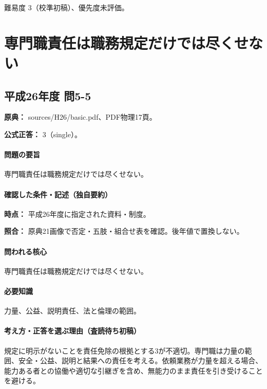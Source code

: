 \par 難易度 3（校準初稿）、優先度未評価。

\section{専門職責任は職務規定だけでは尽くせない}

\subsection{平成26年度 問5-5}
\label{q:h26-reg-basic-5-5}

\noindent\textbf{原典：} sources/H26/basic.pdf、PDF物理17頁。

\textbf{公式正答：} 3（single）。

\paragraph{問題の要旨} 専門職責任は職務規定だけでは尽くせない。

\paragraph{確認した条件・記述（独自要約）}\mbox{}\par

\noindent\textbf{時点：} 平成26年度に指定された資料・制度。\par

\noindent\textbf{照合：} 原典21画像で否定・五肢・組合せ表を確認。後年値で置換しない。\par

\paragraph{問われる核心} 専門職責任は職務規定だけでは尽くせない。

\paragraph{必要知識} 力量、公益、説明責任、法と倫理の範囲。

\paragraph{考え方・正答を選ぶ理由（査読待ち初稿）} 規定に明示がないことを責任免除の根拠とする3が不適切。専門職は力量の範囲、安全・公益、説明と結果への責任を考える。依頼業務が力量を超える場合、能力ある者との協働や適切な引継ぎを含め、無能力のまま責任を引き受けることを避ける。

